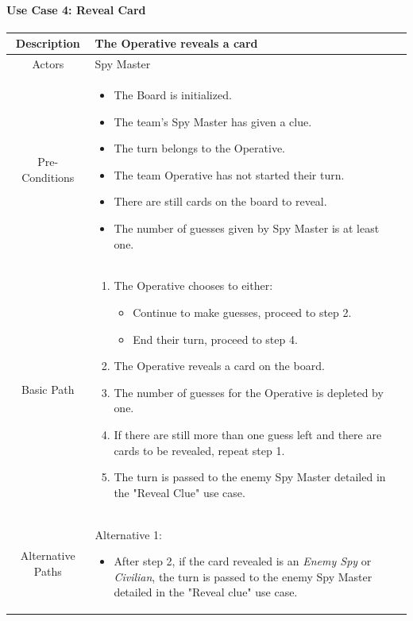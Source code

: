 \documentclass[10pt, a4paper]{article}
\begin{document}
	\newpage
		
	\paragraph{Use Case 4: Reveal Card}
	\begin{center}
		\begin{tabular}{ |c|p{10cm}| } 
			\hline
			Description & The Operative reveals a card \\ 
			\hline
			Actors & Spy Master \\
			\hline 
			Pre-Conditions & \begin{itemize}[noitemsep,topsep=0pt]
				\item The Board is initialized.
				\item The team's Spy Master has given a clue.
				\item The turn belongs to the Operative.
				\item The team Operative has not started their turn.
				\item There are still cards on the board to reveal.
				\item The number of guesses given by Spy Master is at least one.
			\end{itemize} \\
			\hline
			Basic Path & 
			\begin{enumerate}
				\item The Operative chooses to either:
				\begin{itemize}
					\item Continue to make guesses, proceed to step 2.
					\item End their turn, proceed to step 4.
				\end{itemize}
				\item The Operative reveals a card on the board.
				\item The number of guesses for the Operative is depleted by one.
				\item If there are still more than one guess left and there are cards to be revealed, repeat step 1.
				\item The turn is passed to the enemy Spy Master detailed in the "Reveal Clue" use case. 
			\end{enumerate} \\
			\hline 
			Alternative Paths & 
			Alternative 1:
				\begin{itemize}[noitemsep,topsep=0pt]
					\item After step 2, if the card revealed is an \textit{Enemy Spy} or \textit{Civilian}, the turn is passed to the enemy Spy Master detailed in the "Reveal clue" use case.

\end{itemize}
\end{tabular}
\end{center}
\end{document}
